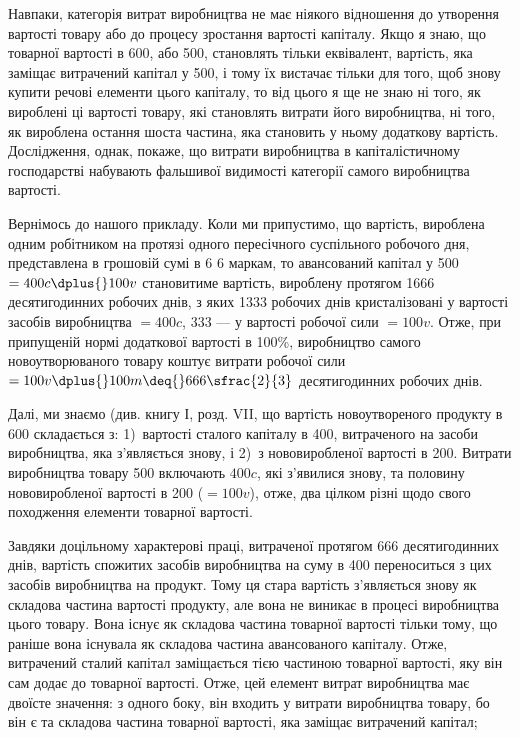 
Навпаки, категорія витрат виробництва не має ніякого відношення
до утворення вартості товару або до процесу зростання
вартості капіталу. Якщо я знаю, що  товарної вартості
в 600, або 500, становлять
тільки еквівалент, вартість, яка заміщає витрачений капітал
у 500, і тому їх вистачає тільки для того, щоб
знову купити речові елементи цього капіталу, то від цього
я ще не знаю ні того, як вироблені ці   вартості товару, які
становлять витрати його виробництва, ні того, як вироблена
остання шоста частина, яка становить у ньому додаткову вартість.
Дослідження, однак, покаже, що витрати виробництва в капіталістичному
господарстві набувають фальшивої видимості категорії
самого виробництва вартості.

Вернімось до нашого прикладу. Коли ми припустимо, що вартість,
вироблена одним робітником на протязі одного пересічного
суспільного робочого дня, представлена в грошовій сумі
в 6 \deq{} 6 маркам, то авансований капітал у 500 $= 400 c \dplus{} 100 v$ становитиме вартість, вироблену протягом
1666 десятигодинних робочих днів, з яких 1333 робочих
днів кристалізовані у вартості засобів виробництва $= 400 c$,
333  — у вартості робочої сили $= 100v$. Отже, при припущеній
нормі додаткової вартості в 100\%, виробництво самого новоутворюваного
товару коштує витрати робочої сили $= 100v \dplus{} 100m \deq{} 666\sfrac{2}{3}$ десятигодинних робочих днів.

Далі, ми знаємо (див. книгу І, розд. VII, що вартість
новоутвореного продукту в 600 складається
з: 1)~вартості сталого капіталу в 400,
витраченого на засоби виробництва, яка з’являється знову, і
2)~з нововиробленої вартості в 200. Витрати
виробництва товару \deq{} 500 включають $400 c$,
які з’явилися знову, та половину нововиробленої вартості в
200 ($= 100 v$), отже, два цілком різні щодо
свого походження елементи товарної вартості.

Завдяки доцільному характерові праці, витраченої протягом
666  десятигодинних днів, вартість спожитих засобів виробництва
на суму в 400 переноситься з цих
засобів виробництва на продукт. Тому ця стара вартість з’являється
знову як складова частина вартості продукту, але вона
не виникає в процесі виробництва цього товару. Вона існує як
складова частина товарної вартості тільки тому, що раніше вона
існувала як складова частина авансованого капіталу. Отже, витрачений
сталий капітал заміщається тією частиною товарної
вартості, яку він сам додає до товарної вартості. Отже, цей
елемент витрат виробництва має двоїсте значення: з одного боку,
він входить у витрати виробництва товару, бо він є та складова
частина товарної вартості, яка заміщає витрачений капітал;
\parbreak{}  %
